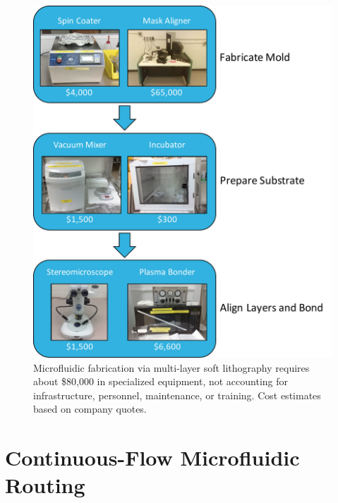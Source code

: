 \begin{figure}[h]
  \begin{minipage}[t]{0.75\linewidth}\centering
    \includegraphics[width=14cm]{equipSoftLith.pdf}
    \medskip
  \end{minipage}\hfill
  \caption[Specialized equipment required to performform soft lithography]{Microfluidic fabrication via multi-layer soft lithography requires about \$80,000 in specialized equipment, not accounting for infrastructure, personnel, maintenance, or training. Cost estimates based on company quotes.}
    \label{fig:equipSoftLith}
\end{figure}


\section{Continuous-Flow Microfluidic Routing}
\label{sec:backgroundCFRouting}

